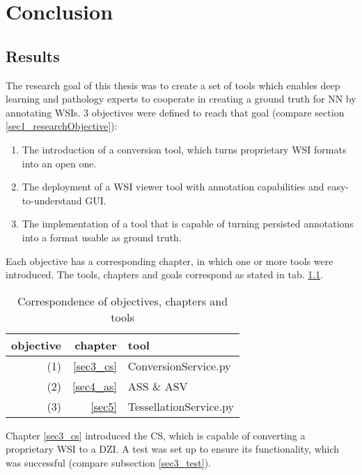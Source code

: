 \chapter{Conclusion}

\section{Results}
The research goal of this thesis was to create a set of tools which enables deep learning and pathology experts to cooperate in creating a ground truth for NN by annotating WSIs. 3 objectives were defined to reach that goal (compare section \ref{sec1_researchObjective}):

\begin{enumerate}[(1)]
	\item The introduction of a conversion tool, which turns proprietary WSI formats into an open one.
	\item The deployment of a WSI viewer tool with annotation capabilities and easy-to-understand GUI.
	\item The implementation of a tool that is capable of turning persisted annotations into a format usable as ground truth.
\end{enumerate}

Each objective has a corresponding chapter, in which one or more tools were introduced. The tools, chapters and goals correspond as stated in tab. \ref{tab6_objCorrespondence}.

\begin{table}[H]
	\begin{center}
		\begin{tabular}{| r | r | l |}
			\hline
			\textbf{objective} & \textbf{chapter} & \textbf{tool} \\ \hline
			(1) & \ref{sec3_cs} & ConversionService.py \\ \hline
			(2) & \ref{sec4_as} & ASS \& ASV \\ \hline
			(3) & \ref{sec5} & TessellationService.py\\ \hline
		\end{tabular}
		\caption{Correspondence of objectives, chapters and tools}
		\label{tab6_objCorrespondence}
	\end{center}
\end{table}

Chapter \ref{sec3_cs} introduced the CS, which is capable of converting a proprietary WSI to a DZI. A test was set up to ensure its functionality, which was successful (compare subsection \ref{sec3_test}).

